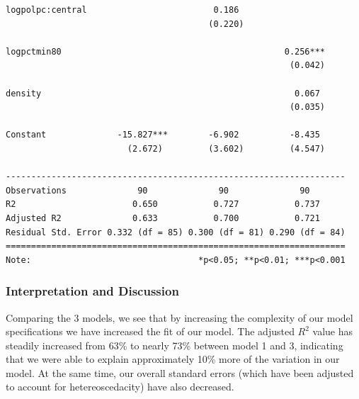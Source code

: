 \documentclass[]{article}
\begin{document}
\begin{verbatim}
logpolpc:central                         0.186                     
                                        (0.220)                    
                                                                   
logpctmin80                                            0.256***    
                                                        (0.042)    
                                                                   
density                                                  0.067     
                                                        (0.035)    
                                                                   
Constant              -15.827***        -6.902          -8.435     
                        (2.672)         (3.602)         (4.547)    
                                                                   
-------------------------------------------------------------------
Observations              90              90              90       
R2                       0.650           0.727           0.737     
Adjusted R2              0.633           0.700           0.721     
Residual Std. Error 0.332 (df = 85) 0.300 (df = 81) 0.290 (df = 84)
===================================================================
Note:                                 *p<0.05; **p<0.01; ***p<0.001
\end{verbatim}

\hypertarget{interpretation-and-discussion}{%
\subsubsection{Interpretation and
Discussion}\label{interpretation-and-discussion}}

Comparing the 3 models, we see that by increasing the complexity of our
model specifications we have increased the fit of our model. The
adjusted \(R^2\) value has steadily increased from 63\% to nearly 73\%
between model 1 and 3, indicating that we were able to explain
approximately 10\% more of the variation in our model. At the same time,
our overall standard errors (which have been adjusted to account for
hetereoscedacity) have also decreased.
\end{document}
